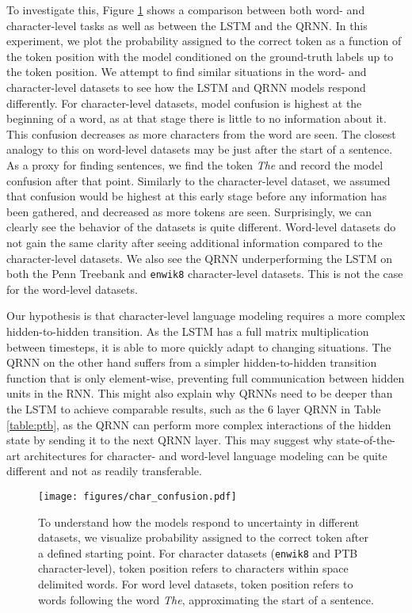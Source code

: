 \documentclass{article}
\newcommand{\enwik}{\texttt{enwik8}\xspace}
\begin{document}
To investigate this, Figure \ref{fig:confusion} shows a comparison between both word- and character-level tasks as well as between the LSTM and the QRNN. In this experiment, we plot the probability assigned to the correct token as a function of the token position with the model conditioned on the ground-truth labels up to the token position. 
We attempt to find similar situations in the word- and character-level datasets to see how the LSTM and QRNN models respond differently.
For character-level datasets, model confusion is highest at the beginning of a word, as at that stage there is little to no information about it.
This confusion decreases as more characters from the word are seen.
The closest analogy to this on word-level datasets may be just after the start of a sentence.
As a proxy for finding sentences, we find the token \textit{The} and record the model confusion after that point.
Similarly to the character-level dataset, we assumed that confusion would be highest at this early stage before any information has been gathered, and decreased as more tokens are seen.
Surprisingly, we can clearly see the behavior of the datasets is quite different.
Word-level datasets do not gain the same clarity after seeing additional information compared to the character-level datasets.
We also see the QRNN underperforming the LSTM on both the Penn Treebank and \enwik character-level datasets.
This is not the case for the word-level datasets.

Our hypothesis is that character-level language modeling requires a more complex hidden-to-hidden transition.
As the LSTM has a full matrix multiplication between timesteps, it is able to more quickly adapt to changing situations.
The QRNN on the other hand suffers from a simpler hidden-to-hidden transition function that is only element-wise, preventing full communication between hidden units in the RNN.
This might also explain why QRNNs need to be deeper than the LSTM to achieve comparable results, such as the 6 layer QRNN in Table \ref{table:ptb}, as the QRNN can perform more complex interactions of the hidden state by sending it to the next QRNN layer.
This may suggest why state-of-the-art architectures for character- and word-level language modeling can be quite different and not as readily transferable.

\begin{figure}
\centering
\texttt{[image: figures/char\_confusion.pdf]}
\caption{
To understand how the models respond to uncertainty in different datasets, we visualize probability assigned to the correct token after a defined starting point. 
For character datasets (\enwik and PTB character-level), token position refers to characters within space delimited words.
For word level datasets, token position refers to words following the word \textit{The}, approximating the start of a sentence.
}
\label{fig:confusion}
\end{figure}
\end{document}
